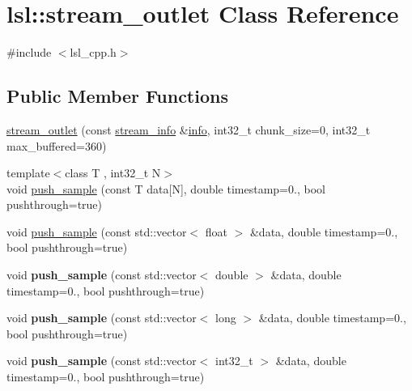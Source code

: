 \hypertarget{classlsl_1_1stream__outlet}{}\section{lsl\+:\+:stream\+\_\+outlet Class Reference}
\label{classlsl_1_1stream__outlet}


{\ttfamily \#include $<$lsl\+\_\+cpp.\+h$>$}

\subsection*{Public Member Functions}
\begin{DoxyCompactItemize}
\item 
\hyperlink{classlsl_1_1stream__outlet_ac88c568fdc7429d95c51cd7b58d902cc}{stream\+\_\+outlet} (const \hyperlink{classlsl_1_1stream__info}{stream\+\_\+info} \&\hyperlink{classlsl_1_1stream__outlet_af6fda8eb922b27ae3ed98651934243fe}{info}, int32\+\_\+t chunk\+\_\+size=0, int32\+\_\+t max\+\_\+buffered=360)
\item 
{\footnotesize template$<$class T , int32\+\_\+t N$>$ }\\void \hyperlink{classlsl_1_1stream__outlet_a675bbe044a5053087e05e0267fe6722a}{push\+\_\+sample} (const T data\mbox{[}N\mbox{]}, double timestamp=0., bool pushthrough=true)
\item 
void \hyperlink{classlsl_1_1stream__outlet_a4c984d8bf178e2321c590aaf81d4da3f}{push\+\_\+sample} (const std\+::vector$<$ float $>$ \&data, double timestamp=0., bool pushthrough=true)
\item 
\mbox{\label{classlsl_1_1stream__outlet_abd59227041d01d48e90d4d5d05da7662}} 
void {\bfseries push\+\_\+sample} (const std\+::vector$<$ double $>$ \&data, double timestamp=0., bool pushthrough=true)
\item 
\mbox{\label{classlsl_1_1stream__outlet_a277f76e889a33849170d5c25fa99c723}} 
void {\bfseries push\+\_\+sample} (const std\+::vector$<$ long $>$ \&data, double timestamp=0., bool pushthrough=true)
\item 
\mbox{\label{classlsl_1_1stream__outlet_aa1f12739e569d284896c7f514f55a301}} 
void {\bfseries push\+\_\+sample} (const std\+::vector$<$ int32\+\_\+t $>$ \&data, double timestamp=0., bool pushthrough=true)

\end{DoxyCompactItemize}
